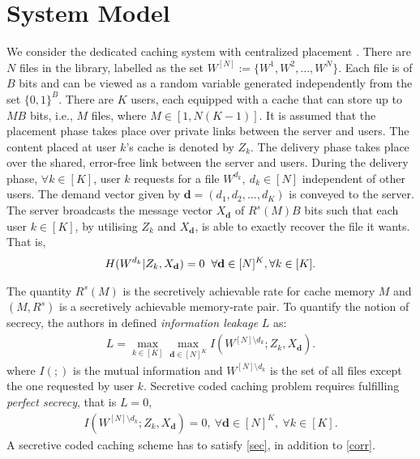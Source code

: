 \documentclass[conference]{IEEEtran}
\begin{document}
\section{System Model}
\label{sec3}
We consider the dedicated caching system with centralized placement \cite{MaNcentCc}. There are $N$ files in the library, labelled as the set $W^{[N]}:=\{W^1,W^2,\ldots, W^N\}$. Each file is of $B$ bits and can be viewed as a random variable generated independently from the set $\{0,1\}^B$. There are $K$ users, each equipped with a cache that can store up to $MB$ bits, i.e., $M$ files, where $M\in[1,N(K-1)]$. It is assumed that the placement phase takes place over private links between the server and users. The content placed at user $k$'s cache is denoted by $Z_k$. The delivery phase takes place over the shared, error-free link between the server and users. During the delivery phase, $\forall k \in [K]$, user $k$ requests for a file $W^{d_k}, \ d_k\in[N]$ independent of other users. The demand vector given by $\mathbf{d}=(d_1,d_2,\ldots,d_K)$ is conveyed to the server. The server broadcasts the message vector $X_\mathbf{d}$ of $R^s(M)B$ bits such that each user $k\in[K]$, by utilising $Z_k$ and $X_{\mathbf{d}}$, is able to exactly recover the file it wants. That is, 
\begin{align}
\label{corr}
H(W^{d_k}\lvert Z_k,X_{\mathbf{d}})=0 \hspace{2mm} \forall \mathbf{d}\in[N]^K, \forall k\in [K].   
\end{align}
\par The quantity $R^s(M)$ is the secretively achievable rate for cache memory $M$ and $(M,R^s)$ is a secretively achievable memory-rate pair. To quantify the notion of secrecy, the authors in \cite{PrivateCc} defined \emph{information leakage} $L$ as:
\begin{align}
L=\max_{k\in[K]}\max_{\mathbf{d}\in[N]^K}I(W^{[N]\setminus d_k};Z_k,X_{\mathbf{d}}).
\end{align}
	where $I(;)$ is the mutual information and $W^{[N]\setminus d_k}$ is the set of all files except the one requested by user $k$. Secretive coded caching problem requires fulfilling \emph{perfect secrecy}, that is $L=0$,
	\begin{align}
	\label{sec}
	    I(W^{[N]\setminus d_k};Z_k,X_{\mathbf{d}})=0, \ \forall \mathbf{d}\in[N]^K, \ \forall k\in [K].
	\end{align}
 A secretive coded caching scheme has to satisfy \eqref{sec}, in addition to \eqref{corr}. 
\end{document}
